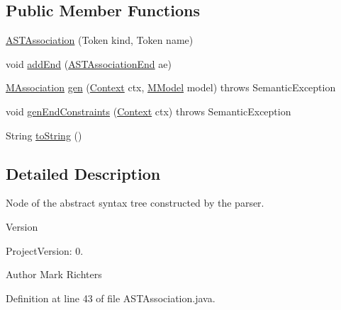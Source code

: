 \subsection*{Public Member Functions}
\begin{DoxyCompactItemize}
\item 
\hyperlink{classorg_1_1tzi_1_1use_1_1parser_1_1use_1_1_a_s_t_association_a741262215c669b5d85b4f3e927ae2330}{A\-S\-T\-Association} (Token kind, Token name)
\item 
void \hyperlink{classorg_1_1tzi_1_1use_1_1parser_1_1use_1_1_a_s_t_association_abf744e484f941c230132209251008cb8}{add\-End} (\hyperlink{classorg_1_1tzi_1_1use_1_1parser_1_1use_1_1_a_s_t_association_end}{A\-S\-T\-Association\-End} ae)
\item 
\hyperlink{interfaceorg_1_1tzi_1_1use_1_1uml_1_1mm_1_1_m_association}{M\-Association} \hyperlink{classorg_1_1tzi_1_1use_1_1parser_1_1use_1_1_a_s_t_association_ab79859d6ba3a56b144a8ae0525905df1}{gen} (\hyperlink{classorg_1_1tzi_1_1use_1_1parser_1_1_context}{Context} ctx, \hyperlink{classorg_1_1tzi_1_1use_1_1uml_1_1mm_1_1_m_model}{M\-Model} model)  throws Semantic\-Exception      
\item 
void \hyperlink{classorg_1_1tzi_1_1use_1_1parser_1_1use_1_1_a_s_t_association_af4668b61a9a85a9dd68ec650a9e6e43d}{gen\-End\-Constraints} (\hyperlink{classorg_1_1tzi_1_1use_1_1parser_1_1_context}{Context} ctx)  throws Semantic\-Exception 
\item 
String \hyperlink{classorg_1_1tzi_1_1use_1_1parser_1_1use_1_1_a_s_t_association_abde5eca5bde654f73316c853d0ef5e5d}{to\-String} ()
\end{DoxyCompactItemize}


\subsection{Detailed Description}
Node of the abstract syntax tree constructed by the parser.

\begin{DoxyVersion}{Version}

\end{DoxyVersion}
\begin{DoxyParagraph}{Project\-Version\-:}
0. 
\end{DoxyParagraph}
\begin{DoxyAuthor}{Author}
Mark Richters 
\end{DoxyAuthor}


Definition at line 43 of file A\-S\-T\-Association.\-java.



